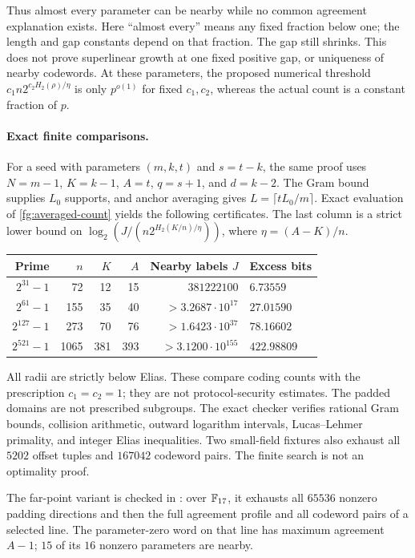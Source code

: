 Thus almost every parameter can be nearby while no common agreement
explanation exists. Here ``almost every'' means any fixed fraction
below one; the length and gap constants depend on that fraction.
The gap still shrinks. This does not prove superlinear growth at one
fixed positive gap, or uniqueness of nearby codewords. At these
parameters, the proposed numerical threshold
$c_1n2^{c_2H_2(\rho)/\eta}$ is only $p^{o(1)}$ for fixed $c_1,c_2$,
whereas the actual count is a constant fraction of $p$.





\paragraph{Exact finite comparisons.}
For a seed with parameters $(m,k,t)$ and $s=t-k$, the same proof uses
$N=m-1$, $K=k-1$, $A=t$, $q=s+1$, and $d=k-2$.
The Gram bound supplies $L_0$ supports, and anchor averaging gives
$L=\lceil tL_0/m\rceil$. Exact evaluation of
\eqref{fg:averaged-count} yields the following certificates.
The last column is a strict lower bound on
$\log_2(J/(n2^{H_2(K/n)/\eta}))$, where $\eta=(A-K)/n$.
\begin{center}
\begin{tabular}{@{}rrrrrl@{}}
\toprule
Prime & $n$ & $K$ & $A$ & Nearby labels $J$ & Excess bits\\
\midrule
$2^{31}-1$&72&12&15&$381222100$&$6.73559$\\
$2^{61}-1$&155&35&40&$>3.2687\cdot10^{17}$&$27.01590$\\
$2^{127}-1$&273&70&76&$>1.6423\cdot10^{37}$&$78.16602$\\
$2^{521}-1$&1065&381&393&$>3.1200\cdot10^{155}$&$422.98809$\\
\bottomrule
\end{tabular}
\end{center}
All radii are strictly below Elias. These compare coding counts with
the prescription $c_1=c_2=1$; they are not protocol-security estimates.
The padded domains are not prescribed subgroups. The exact checker
 verifies
rational Gram bounds, collision arithmetic, outward logarithm intervals,
Lucas--Lehmer primality, and integer Elias inequalities. Two small-field
fixtures also exhaust all $5202$ offset tuples and $167042$ codeword
pairs. The finite search is not an optimality proof.

The far-point variant is checked in
: over
$\mathbb F_{17}$, it exhausts all $65536$ nonzero padding directions and then
the full agreement profile and all codeword pairs of a selected line.
The parameter-zero word on that line has maximum agreement $A-1$; $15$ of its
$16$ nonzero parameters are nearby.


